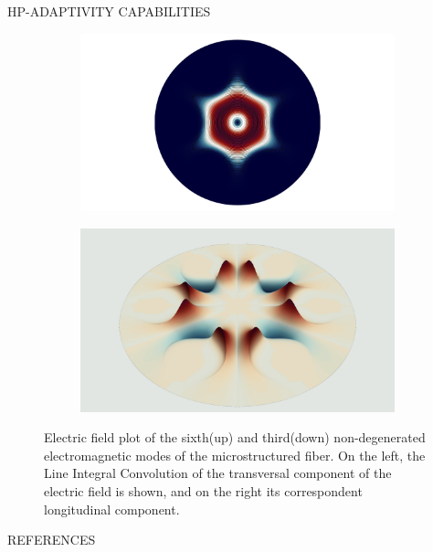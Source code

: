 \documentclass[debug]{beamer} %
\begin{document}
\begin{frame}
\begin{minipage}[t]{0.45\textwidth}
\begin{block}{\boxnumber HP-ADAPTIVITY CAPABILITIES }
\begin{figure}[hb]
\begin{mdframed}[backgroundcolor=bggrey]
					\begin{subfigure}[b]{.4999\textwidth}
						\centering
						\includegraphics[width=1\linewidth]{images/et2posterHoley.png}%
					\end{subfigure}\hfill
					\begin{subfigure}[b]{.4999\textwidth}
						\centering
						\includegraphics[width=1\linewidth]{images/ez2posterHoley.png}%
					\end{subfigure}
				\end{mdframed}
				\caption{Electric field plot of the sixth(up) and third(down) non-degenerated electromagnetic modes of the microstructured fiber. On the left, the Line Integral Convolution of the transversal component of the electric field is shown, and on the right its correspondent longitudinal component.}
				\label{fig:plot-holey}
			\end{figure}
        \end{block}
        \vfill
        \begin{block}{REFERENCES}
        	\printbibliography
        \end{block}
    \end{minipage}
\end{frame}
\end{document}
